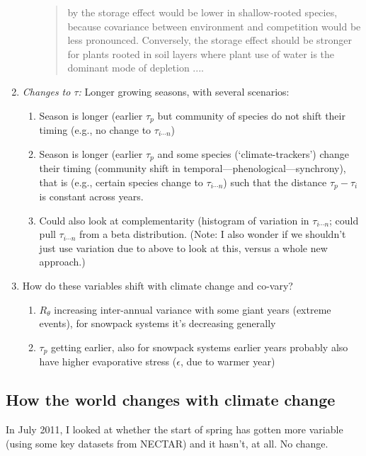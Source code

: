 \documentclass[11pt,a4paper,oneside]{article}
\begin{document}
\begin{enumerate}
\begin{enumerate}
\begin{quote}
by the storage effect would be lower in shallow-rooted
species, because covariance between environment and competition would be less pronounced. Conversely, the
storage effect should be stronger for plants rooted in soil
layers where plant use of water is the dominant mode of
depletion ....
\end{quote}
\end{enumerate}
\item \emph{Changes to \(\tau\):} Longer growing seasons, with several scenarios:
\begin{enumerate}
\item Season is longer (earlier \(\tau_{p}\) but community of species
  do not shift their timing (e.g., no change to  \(\tau_{i \cdots
    n}\)) 
\item Season is longer (earlier \(\tau_{p}\) and some species (`climate-trackers') change
  their timing (community shift in temporal---phenological---synchrony),
  that is (e.g., certain species change to  \(\tau_{i \cdots
    n}\)) such that the distance \(\tau_{p}-\tau_{i}\) is constant
  across years.
\item Could also look at complementarity (histogram of variation in \(\tau_{i \cdots
    n}\); could pull \(\tau_{i \cdots
    n}\) from a beta distribution. (Note: I also wonder if we
  shouldn't just use variation due to above to look at this, versus a
  whole new approach.)
\end{enumerate}
\item How do these variables shift with climate change and co-vary?
\begin{enumerate} 
\item \(R_{\theta}\) increasing inter-annual variance with some giant
  years (extreme events), for snowpack systems it's decreasing
  generally
\item \(\tau_{p}\) getting earlier, also for snowpack systems earlier
  years probably also have higher evaporative stress (\(\epsilon\),
  due to warmer year)
\end{enumerate}
\end{enumerate}


\subsection{How the world changes with climate change}

\noindent In July 2011, I looked at whether the start of spring
has gotten more variable (using some key datasets from NECTAR) and it
hasn't, at all. No change.\\
\end{document}
